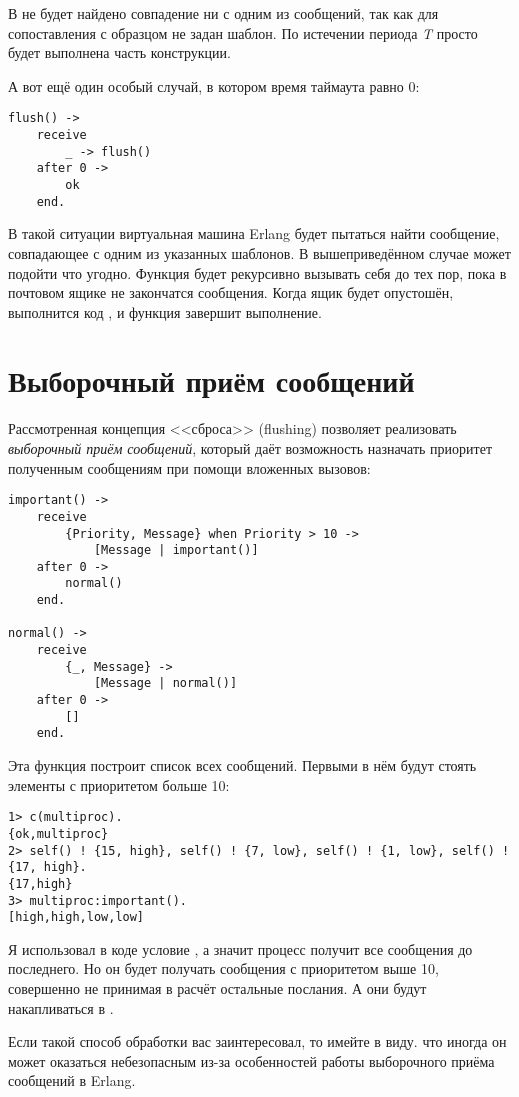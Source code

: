 В  не будет найдено совпадение ни с одним из сообщений, так как для сопоставления с образцом не задан шаблон.
По истечении периода \emph{T} просто будет выполнена  часть конструкции.

А вот ещё один особый случай, в котором время таймаута равно 0:
\begin{lstlisting}[style=erlang]
flush() ->
    receive
        _ -> flush()
    after 0 ->
        ok
    end.
\end{lstlisting}

В такой ситуации виртуальная машина Erlang будет пытаться найти сообщение, совпадающее с одним из указанных шаблонов.
В вышеприведённом случае может подойти что угодно.
Функция  будет рекурсивно вызывать себя до тех пор, пока в почтовом ящике не закончатся сообщения.
Когда ящик будет опустошён, выполнится код , и функция завершит выполнение.
\section{Выборочный приём сообщений}
Рассмотренная  концепция <<сброса>> (flushing) позволяет реализовать \emph{выборочный приём сообщений}, который даёт возможность назначать приоритет полученным сообщениям при помощи вложенных вызовов:
\begin{lstlisting}[style=erlang]
important() ->
    receive
        {Priority, Message} when Priority > 10 ->
            [Message | important()]
    after 0 ->
        normal()
    end.
 
normal() ->
    receive
        {_, Message} ->
            [Message | normal()]
    after 0 ->
        []
    end.
\end{lstlisting}

Эта функция построит список всех сообщений.
Первыми в нём будут стоять элементы с приоритетом больше 10:
\begin{lstlisting}[style=erlang]
1> c(multiproc).
{ok,multiproc}
2> self() ! {15, high}, self() ! {7, low}, self() ! {1, low}, self() ! {17, high}.      
{17,high}
3> multiproc:important().
[high,high,low,low]
\end{lstlisting}

Я использовал в коде условие , а значит процесс получит все сообщения до последнего.
Но он будет получать сообщения с приоритетом выше 10, совершенно не принимая в расчёт остальные послания.
А они будут накапливаться в .

Если такой способ обработки вас заинтересовал, то имейте в виду. что иногда он может оказаться небезопасным из\--за особенностей работы выборочного приёма сообщений в Erlang.

